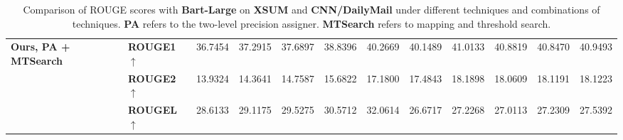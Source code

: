 \begin{table}[ht!]
{\begin{tabular}{llcccccccccc}
\multirow{3}{*}{\textbf{Ours, PA + MTSearch}} 
 & \textbf{ROUGE1$\uparrow$} 
   & 36.7454 & 37.2915 & 37.6897 & 38.8396 & 40.2669
   & 40.1489 & 41.0133 & 40.8819 & 40.8470 & 40.9493 \\
 & \textbf{ROUGE2$\uparrow$} 
   & 13.9324 & 14.3641 & 14.7587 & 15.6822 & 17.1800
   & 17.4843 & 18.1898 & 18.0609 & 18.1191 & 18.1223 \\
 & \textbf{ROUGEL$\uparrow$} 
   & 28.6133 & 29.1175 & 29.5275 & 30.5712 & 32.0614
   & 26.6717 & 27.2268 & 27.0113 & 27.2309 & 27.5392 \\
\bottomrule
\end{tabular}
}

\caption{Comparison of ROUGE scores with \textbf{Bart-Large} on \textbf{XSUM} and \textbf{CNN/DailyMail }under different techniques and combinations of techniques. \textbf{PA} refers to the two-level precision assigner. \textbf{MTSearch} refers to mapping and threshold search.}
\label{tab:encdecablation}
\vskip -0.2in
\end{table}




